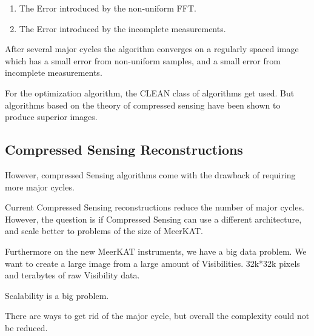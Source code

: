 \begin{enumerate}
	\item The Error introduced by the non-uniform FFT.
	\item The Error introduced by the incomplete measurements.
\end{enumerate}

After several major cycles the algorithm converges on a regularly spaced image which has a small error from non-uniform samples, and a small error from incomplete measurements.

For the optimization algorithm, the CLEAN class of algorithms get used. But algorithms based on the theory of compressed sensing have been shown to produce superior images.


\subsection{Compressed Sensing Reconstructions}
 However, compressed Sensing algorithms come with the drawback of requiring more major cycles.

Current Compressed Sensing reconstructions reduce the number of major cycles. However, the question is if Compressed Sensing can use a different architecture, and scale better to problems of the size of MeerKAT.

Furthermore on the new MeerKAT instruments, we have a big data problem. We want to create a large image from a large amount of Visibilities. 32k*32k pixels and terabytes of raw Visibility data. 

Scalability is a big problem.

There are ways to get rid of the major cycle, but overall the complexity could not be reduced.









